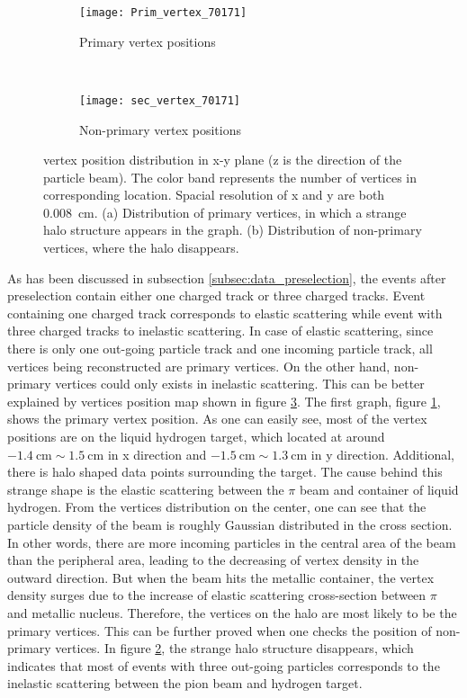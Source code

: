 \begin{figure}[!b]
	\centering
	\begin{subfigure}[t]{0.5\textwidth}
		\texttt{[image: Prim\_vertex\_70171]}
		\caption{Primary vertex positions}
		\label{fig:Prim_vertex_70171}
	\end{subfigure}
	~ %
	\begin{subfigure}[b]{0.5\textwidth}
		\texttt{[image: sec\_vertex\_70171]}
		\caption{Non-primary vertex positions}
		\label{fig:sec_vertex_70171}
	\end{subfigure}
	\caption{vertex position distribution in x-y plane (z is the direction of the particle beam). The color band represents the number of vertices in corresponding location. Spacial resolution of x and y are both \SI{0.008}{\centi\meter}. (a) Distribution of primary vertices, in which a strange halo structure appears in the graph. (b) Distribution of non-primary vertices, where the halo disappears.}
	\label{fig:ver_pos}
\end{figure}

As has been discussed in subsection \ref{subsec:data_preselection}, the events after preselection contain either one charged track or three charged tracks. Event containing one charged track corresponds to elastic scattering while event with three charged tracks to inelastic scattering. In case of elastic scattering, since there is only one out-going particle track and one incoming particle track, all vertices being reconstructed are primary vertices. On the other hand, non-primary vertices could only exists in inelastic scattering. This can be better explained by vertices position map shown in figure \ref{fig:ver_pos}. The first graph, figure \ref{fig:Prim_vertex_70171}, shows the primary vertex position. As one can easily see, most of the vertex positions are on the liquid hydrogen target, which located at around $\SI{-1.4}{\centi\meter} \sim \SI{1.5}{\centi\meter}$ in x direction and $\SI{-1.5}{\centi\meter} \sim \SI{1.3}{\centi\meter}$ in y direction. Additional, there is halo shaped data points surrounding the target. The cause behind this strange shape is the elastic scattering between the $\pi$ beam and container of liquid hydrogen. From the vertices distribution on the center, one can see that the particle density of the beam is roughly Gaussian distributed in the cross section. In other words, there are more incoming particles in the central area of the beam than the peripheral area, leading to the decreasing of vertex density in the outward direction. But when the beam hits the metallic container, the vertex density surges due to the increase of elastic scattering cross-section between $\pi$ and metallic nucleus. Therefore, the vertices on the halo are most likely to be the primary vertices. This can be further proved when one checks the position of non-primary vertices. In figure \ref{fig:sec_vertex_70171}, the strange halo structure disappears, which indicates that most of events with three out-going particles corresponds to the inelastic scattering between the pion beam and hydrogen target.  

